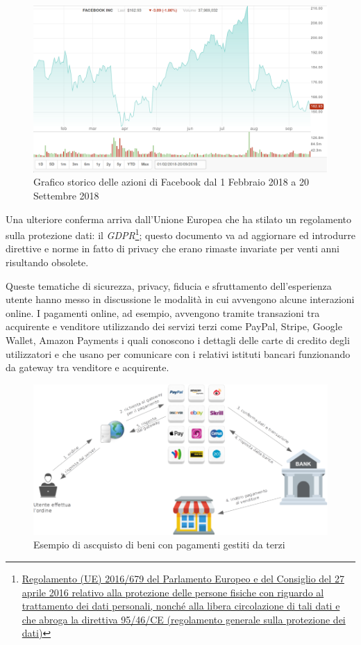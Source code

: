 \begin{figure}
    \centering
    \includegraphics[scale=1.3]{images/facebookstock.png}
    \caption{Grafico storico delle azioni di Facebook dal 1 Febbraio 2018 a 20 Settembre 2018}
\end{figure}

Una ulteriore conferma arriva dall'Unione Europea che ha stilato un regolamento sulla protezione dati: il \textit{GDPR}\footnote{\href{https://eur-lex.europa.eu/legal-content/IT/TXT/HTML/?uri=CELEX:32016R0679}{Regolamento (UE) 2016/679 del Parlamento Europeo e del Consiglio del 27 aprile 2016 relativo alla protezione delle persone fisiche con riguardo al trattamento dei dati personali, nonché alla libera circolazione di tali dati e che abroga la direttiva 95/46/CE (regolamento generale sulla protezione dei dati)}}; questo documento va ad aggiornare ed introdurre direttive e norme in fatto di privacy che erano rimaste invariate per venti anni risultando obsolete.\newline

Queste tematiche di sicurezza, privacy, fiducia e sfruttamento dell'esperienza utente hanno messo in discussione le modalità in cui avvengono alcune interazioni online. I pagamenti online, ad esempio, avvengono tramite transazioni tra acquirente e venditore utilizzando dei servizi terzi come PayPal, Stripe, Google Wallet, Amazon Payments i quali conoscono i dettagli delle carte di credito degli utilizzatori e che usano per comunicare con i relativi istituti bancari funzionando da gateway tra venditore e acquirente.\newline

\begin{figure}
    \centering
    \includegraphics[scale=0.5]{images/onlinepayments.png}
    \caption{Esempio di ascquisto di beni con pagamenti gestiti da terzi}
\end{figure}

